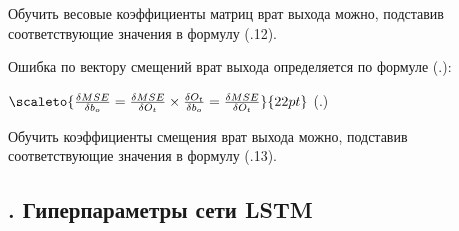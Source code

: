 {  \par \redline Обучить весовые коэффициенты матриц врат выхода можно, подставив соответствующие значения в формулу (\thechaptercntr .12).

  \par \redline Ошибка по вектору смещений врат выхода определяется по формуле (\thechaptercntr .\theformulacntr):

  \formulaspace \par \redline 
    $\scaleto{\frac{\delta MSE}{\delta b_o} = \frac{\delta MSE}{\delta O_t} \times \frac{\delta O_t}{\delta b_o} = \frac{\delta MSE}{\delta O_t}}{22pt}$
    \hfill (\thechaptercntr .\theformulacntr) \redline
  \formulaspace \addtocounter{formulacntr}{1}

  \par \redline Обучить коэффициенты смещения врат выхода можно, подставив соответствующие значения в формулу (\thechaptercntr .13).

  \par
}

\subtitlespace

\subsection*{ 
  \gostTitleFont
  \redline
  \thechaptercntr .\thesubchaptercntr \spc 
  Гиперпараметры сети LSTM 
} \addtocounter{subchaptercntr}{1} 
  
\subtitlespace
  
